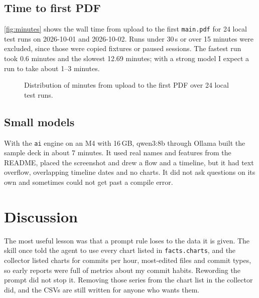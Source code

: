 \documentclass[11pt]{article}
\begin{document}
\subsection{Time to first PDF}

\autoref{fig:minutes} shows the wall time from upload to the first \texttt{main.pdf} for 24 local test runs on 2026-10-01 and 2026-10-02. Runs under 30\,s or over 15 minutes were excluded, since those were copied fixtures or paused sessions. The fastest run took 0.6 minutes and the slowest 12.69 minutes; with a strong model I expect a run to take about 1--3 minutes.

\begin{figure}[htbp]
\centering
{}
\caption{Distribution of minutes from upload to the first PDF over 24 local test runs.}
\label{fig:minutes}
\end{figure}

\subsection{Small models}

With the \texttt{ai} engine on an M4 with 16\,GB, qwen3:8b through Ollama built the sample deck in about 7 minutes. It used real names and features from the README, placed the screenshot and drew a flow and a timeline, but it had text overflow, overlapping timeline dates and no charts. It did not ask questions on its own and sometimes could not get past a compile error.

\section{Discussion}
\label{sec:discussion}

The most useful lesson was that a prompt rule loses to the data it is given. The skill once told the agent to use every chart listed in \texttt{facts.charts}, and the collector listed charts for commits per hour, most-edited files and commit types, so early reports were full of metrics about my commit habits. Rewording the prompt did not stop it. Removing those series from the chart list in the collector did, and the CSVs are still written for anyone who wants them.
\end{document}
